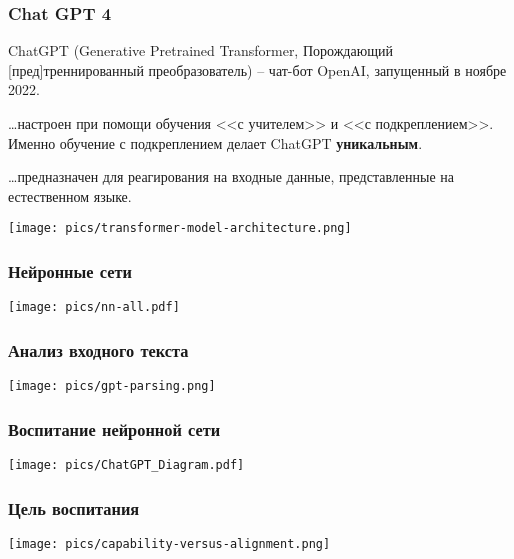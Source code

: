 \documentclass[10pt]{beamer}
\begin{document}

\begin{frame}
  \frametitle{Chat GPT 4}
  ChatGPT (Generative Pretrained Transformer, Порождающий [пред]треннированный преобразователь) -- чат-бот OpenAI, запущенный в ноябре 2022.

  \ldots настроен при помощи обучения <<с учителем>> и <<с подкреплением>>.  Именно обучение с подкреплением делает ChatGPT \textbf{уникальным}.

  \ldots предназначен для реагирования на входные данные, представленные на естественном языке.

  \begin{center}
    \texttt{[image: pics/transformer-model-architecture.png]}
  \end{center}
\end{frame}

\begin{frame}
  \frametitle{Нейронные сети}
  \begin{center}
    \texttt{[image: pics/nn-all.pdf]}
  \end{center}
\end{frame}

\begin{frame}
  \frametitle{Анализ входного текста}
  \begin{center}
    \texttt{[image: pics/gpt-parsing.png]}
  \end{center}
\end{frame}

\begin{frame}
  \frametitle{Воспитание нейронной сети}
  \begin{center}
    \texttt{[image: pics/ChatGPT\_Diagram.pdf]}
  \end{center}
\end{frame}

\begin{frame}
  \frametitle{Цель воспитания}
  \begin{center}
    \texttt{[image: pics/capability-versus-alignment.png]}
  \end{center}
\end{frame}

\end{document}
